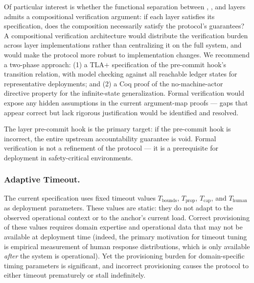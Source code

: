 Of particular interest is whether the functional separation between \purpose{}, \bounds{}, and \fact{} layers admits a compositional verification argument: if each layer satisfies its specification, does the composition necessarily satisfy the protocol's guarantees? A compositional verification architecture would distribute the verification burden across layer implementations rather than centralizing it on the full system, and would make the protocol more robust to implementation changes. We recommend a two-phase approach: (1) a TLA$+$ specification of the pre-commit hook's transition relation, with model checking against all reachable ledger states for representative deployments; and (2) a Coq proof of the no-machine-actor directive property for the infinite-state generalization. Formal verification would expose any hidden assumptions in the current argument-map proofs — gaps that appear correct but lack rigorous justification would be identified and resolved.

The \fact{} layer pre-commit hook is the primary target: if the pre-commit hook is incorrect, the entire upstream accountability guarantee is void. Formal verification is not a refinement of the protocol — it is a prerequisite for deployment in safety-critical environments.

\subsubsection{Adaptive Timeout.}
The current specification uses fixed timeout values $T_{\mathrm{bounds}}$, $T_{\mathrm{prop}}$, $T_{\mathrm{cap}}$, and $T_{\mathrm{human}}$ as deployment parameters. These values are static: they do not adapt to the observed operational context or to the anchor's current load. Correct provisioning of these values requires domain expertise and operational data that may not be available at deployment time (indeed, the primary motivation for timeout tuning is empirical measurement of human response distributions, which is only available \emph{after} the system is operational). Yet the provisioning burden for domain-specific timing parameters is significant, and incorrect provisioning causes the protocol to either timeout prematurely or stall indefinitely.

